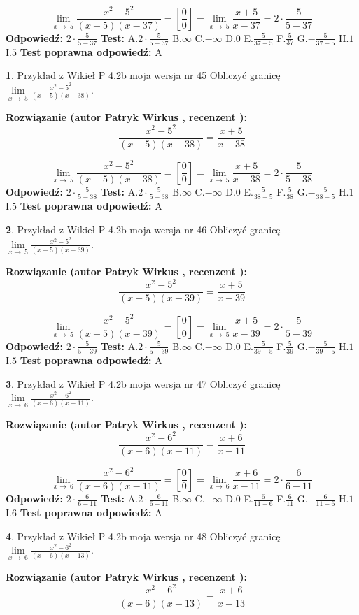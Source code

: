 \documentclass[12pt, a4paper]{article}
\theoremstyle{definition} %
\newtheorem{zad}{}
\newcommand{\zadStart}[1]{\begin{zad}#1\newline}
\newcommand{\zadStop}{\end{zad}}
\newcommand{\rozwStart}[2]{\noindent \textbf{Rozwiązanie (autor #1 , recenzent #2): }\newline}
\newcommand{\rozwStop}{\newline}
\newcommand{\odpStart}{\noindent \textbf{Odpowiedź:}\newline}
\newcommand{\odpStop}{\newline}
\newcommand{\testStart}{\noindent \textbf{Test:}\newline}
\newcommand{\testStop}{\newline}
\newcommand{\kluczStart}{\noindent \textbf{Test poprawna odpowiedź:}\newline}
\newcommand{\kluczStop}{\newline}
\begin{document}
$$\lim\limits_{x\to\ 5}\frac{x^{2}-5^{2}}{(x-5)(x-37)}=[\frac{0}{0}]=\lim\limits_{x\to\ 5}\frac{x+5}{x-37}=2 \cdot \frac{5}{5-37}$$
\rozwStop
\odpStart
$2 \cdot \frac{5}{5-37}$
\odpStop
\testStart
A.$2 \cdot \frac{5}{5-37}$
B.$\infty$
C.$-\infty$
D.$0$
E.$\frac{5}{37-5}$
F.$\frac{5}{37}$
G.$-\frac{5}{37-5}$
H.$1$
I.$5$
\testStop
\kluczStart
A
\kluczStop



\zadStart{Przykład z Wikieł P 4.2b moja wersja nr 45}
Obliczyć granicę $\lim\limits_{x\to\ 5}\frac{x^{2}-5^{2}}{(x-5)(x-38)}$.
\zadStop
\rozwStart{Patryk Wirkus}{}
$$\frac{x^{2}-5^{2}}{(x-5)(x-38)}=\frac{x+5}{x-38}$$

$$\lim\limits_{x\to\ 5}\frac{x^{2}-5^{2}}{(x-5)(x-38)}=[\frac{0}{0}]=\lim\limits_{x\to\ 5}\frac{x+5}{x-38}=2 \cdot \frac{5}{5-38}$$
\rozwStop
\odpStart
$2 \cdot \frac{5}{5-38}$
\odpStop
\testStart
A.$2 \cdot \frac{5}{5-38}$
B.$\infty$
C.$-\infty$
D.$0$
E.$\frac{5}{38-5}$
F.$\frac{5}{38}$
G.$-\frac{5}{38-5}$
H.$1$
I.$5$
\testStop
\kluczStart
A
\kluczStop



\zadStart{Przykład z Wikieł P 4.2b moja wersja nr 46}
Obliczyć granicę $\lim\limits_{x\to\ 5}\frac{x^{2}-5^{2}}{(x-5)(x-39)}$.
\zadStop
\rozwStart{Patryk Wirkus}{}
$$\frac{x^{2}-5^{2}}{(x-5)(x-39)}=\frac{x+5}{x-39}$$

$$\lim\limits_{x\to\ 5}\frac{x^{2}-5^{2}}{(x-5)(x-39)}=[\frac{0}{0}]=\lim\limits_{x\to\ 5}\frac{x+5}{x-39}=2 \cdot \frac{5}{5-39}$$
\rozwStop
\odpStart
$2 \cdot \frac{5}{5-39}$
\odpStop
\testStart
A.$2 \cdot \frac{5}{5-39}$
B.$\infty$
C.$-\infty$
D.$0$
E.$\frac{5}{39-5}$
F.$\frac{5}{39}$
G.$-\frac{5}{39-5}$
H.$1$
I.$5$
\testStop
\kluczStart
A
\kluczStop



\zadStart{Przykład z Wikieł P 4.2b moja wersja nr 47}
Obliczyć granicę $\lim\limits_{x\to\ 6}\frac{x^{2}-6^{2}}{(x-6)(x-11)}$.
\zadStop
\rozwStart{Patryk Wirkus}{}
$$\frac{x^{2}-6^{2}}{(x-6)(x-11)}=\frac{x+6}{x-11}$$

$$\lim\limits_{x\to\ 6}\frac{x^{2}-6^{2}}{(x-6)(x-11)}=[\frac{0}{0}]=\lim\limits_{x\to\ 6}\frac{x+6}{x-11}=2 \cdot \frac{6}{6-11}$$
\rozwStop
\odpStart
$2 \cdot \frac{6}{6-11}$
\odpStop
\testStart
A.$2 \cdot \frac{6}{6-11}$
B.$\infty$
C.$-\infty$
D.$0$
E.$\frac{6}{11-6}$
F.$\frac{6}{11}$
G.$-\frac{6}{11-6}$
H.$1$
I.$6$
\testStop
\kluczStart
A
\kluczStop



\zadStart{Przykład z Wikieł P 4.2b moja wersja nr 48}
Obliczyć granicę $\lim\limits_{x\to\ 6}\frac{x^{2}-6^{2}}{(x-6)(x-13)}$.
\zadStop
\rozwStart{Patryk Wirkus}{}
$$\frac{x^{2}-6^{2}}{(x-6)(x-13)}=\frac{x+6}{x-13}$$
\end{document}

